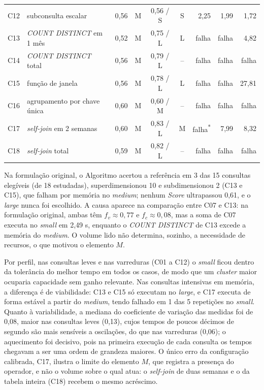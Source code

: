 \begin{table}[H]
\begin{tabular}{llccccrrr}
	C12 & subconsulta escalar & 0,56 & M & 0,56 / S & S & 2,25 & 1,99 & 1,72 \\
	C13 & \textit{COUNT DISTINCT} em 1 mês & 0,52 & M & 0,75 / L & L & falha & falha & 4,82 \\
	C14 & \textit{COUNT DISTINCT} total & 0,56 & M & 0,79 / L & -- & falha & falha & falha \\
	C15 & função de janela & 0,56 & M & 0,78 / L & L & falha & falha & 27,81 \\
	C16 & agrupamento por chave única & 0,60 & M & 0,60 / M & -- & falha & falha & falha \\
	C17 & \textit{self-join} em 2 semanas & 0,60 & M & 0,83 / L & M & falha\textsuperscript{*} & 7,99 & 8,32 \\
	C18 & \textit{self-join} total & 0,59 & M & 0,82 / L & -- & falha & falha & falha \\
	\hline
	\end{tabular}
\end{table}

Na formulação original, o Algoritmo acertou a referência em 3 das 15 consultas elegíveis (de 18 estudadas), superdimensionou 10 e subdimensionou 2 (C13 e C15), que falham por memória no \textit{medium}; nenhum \textit{Score} ultrapassou 0,61, e o \textit{large} nunca foi escolhido. A causa aparece na comparação entre C07 e C13: na formulação original, ambas têm $f_v \approx 0,77$ e $f_c \approx 0,08$, mas a soma de C07 executa no \textit{small} em 2,49 s, enquanto o \textit{COUNT DISTINCT} de C13 excede a memória do \textit{medium}. O volume lido não determina, sozinho, a necessidade de recursos, o que motivou o elemento $M$.

Por perfil, nas consultas leves e nas varreduras (C01 a C12) o \textit{small} ficou dentro da tolerância do melhor tempo em todos os casos, de modo que um \textit{cluster} maior ocuparia capacidade sem ganho relevante. Nas consultas intensivas em memória, a diferença é de viabilidade: C13 e C15 só executam no \textit{large}, e C17 executa de forma estável a partir do \textit{medium}, tendo falhado em 1 das 5 repetições no \textit{small}. Quanto à variabilidade, a mediana do coeficiente de variação das medidas foi de 0,08, maior nas consultas leves (0,13), cujos tempos de poucos décimos de segundo são mais sensíveis a oscilações, do que nas varreduras (0,06); o aquecimento foi decisivo, pois na primeira execução de cada consulta os tempos chegavam a ser uma ordem de grandeza maiores. O único erro da configuração calibrada, C17, ilustra o limite do elemento $M$, que registra a presença do operador, e não o volume sobre o qual atua: o \textit{self-join} de duas semanas e o da tabela inteira (C18) recebem o mesmo acréscimo.

